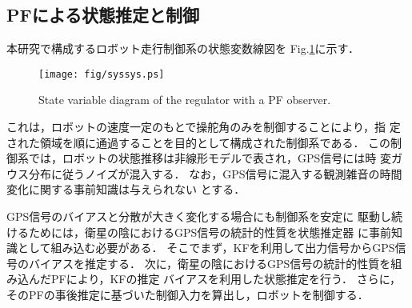 \documentclass[a4paper,10pt,twocolumn,fleqn]{jsarticle}
\begin{document}
\subsection{PFによる状態推定と制御}
\vspace{-2mm}
本研究で構成するロボット走行制御系の状態変数線図を
Fig.\ref{fig:system2}に示す．
\begin{figure}[bp]
 \centering
 \texttt{[image: fig/syssys.ps]}
 \caption{State variable diagram of the regulator with a PF observer.}
 \label{fig:system2}
\end{figure}
%
これは，ロボットの速度一定のもとで操舵角のみを制御することにより，指
定された領域を順に通過することを目的として構成された制御系である．
%
この制御系では，ロボットの状態推移は非線形モデルで表され，GPS信号には時
変ガウス分布に従うノイズが混入する．
なお，GPS信号に混入する観測雑音の時間変化に関する事前知識は与えられない
とする．

GPS信号のバイアスと分散が大きく変化する場合にも制御系を安定に
駆動し続けるためには，衛星の陰におけるGPS信号の統計的性質を状態推定器
に事前知識として組み込む必要がある．
%
そこでまず，KFを利用して出力信号からGPS信号のバイアスを推定する．
%
次に，衛星の陰におけるGPS信号の統計的性質を組み込んだPFにより，KFの推定
バイアスを利用した状態推定を行う．
%
さらに，そのPFの事後推定に基づいた制御入力を算出し，ロボットを制御する．
\vspace{-4mm}
\end{document}
